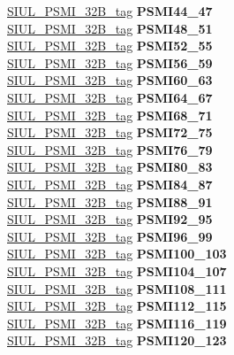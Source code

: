 \begin{DoxyCompactItemize}
\begin{tabbing}
\>\>\mbox{\hyperlink{unionSIUL__PSMI__32B__tag}{SIUL\_PSMI\_32B\_tag}} {\bfseries PSMI44\_47}\\
\>\>\mbox{\hyperlink{unionSIUL__PSMI__32B__tag}{SIUL\_PSMI\_32B\_tag}} {\bfseries PSMI48\_51}\\
\>\>\mbox{\hyperlink{unionSIUL__PSMI__32B__tag}{SIUL\_PSMI\_32B\_tag}} {\bfseries PSMI52\_55}\\
\>\>\mbox{\hyperlink{unionSIUL__PSMI__32B__tag}{SIUL\_PSMI\_32B\_tag}} {\bfseries PSMI56\_59}\\
\>\>\mbox{\hyperlink{unionSIUL__PSMI__32B__tag}{SIUL\_PSMI\_32B\_tag}} {\bfseries PSMI60\_63}\\
\>\>\mbox{\hyperlink{unionSIUL__PSMI__32B__tag}{SIUL\_PSMI\_32B\_tag}} {\bfseries PSMI64\_67}\\
\>\>\mbox{\hyperlink{unionSIUL__PSMI__32B__tag}{SIUL\_PSMI\_32B\_tag}} {\bfseries PSMI68\_71}\\
\>\>\mbox{\hyperlink{unionSIUL__PSMI__32B__tag}{SIUL\_PSMI\_32B\_tag}} {\bfseries PSMI72\_75}\\
\>\>\mbox{\hyperlink{unionSIUL__PSMI__32B__tag}{SIUL\_PSMI\_32B\_tag}} {\bfseries PSMI76\_79}\\
\>\>\mbox{\hyperlink{unionSIUL__PSMI__32B__tag}{SIUL\_PSMI\_32B\_tag}} {\bfseries PSMI80\_83}\\
\>\>\mbox{\hyperlink{unionSIUL__PSMI__32B__tag}{SIUL\_PSMI\_32B\_tag}} {\bfseries PSMI84\_87}\\
\>\>\mbox{\hyperlink{unionSIUL__PSMI__32B__tag}{SIUL\_PSMI\_32B\_tag}} {\bfseries PSMI88\_91}\\
\>\>\mbox{\hyperlink{unionSIUL__PSMI__32B__tag}{SIUL\_PSMI\_32B\_tag}} {\bfseries PSMI92\_95}\\
\>\>\mbox{\hyperlink{unionSIUL__PSMI__32B__tag}{SIUL\_PSMI\_32B\_tag}} {\bfseries PSMI96\_99}\\
\>\>\mbox{\hyperlink{unionSIUL__PSMI__32B__tag}{SIUL\_PSMI\_32B\_tag}} {\bfseries PSMI100\_103}\\
\>\>\mbox{\hyperlink{unionSIUL__PSMI__32B__tag}{SIUL\_PSMI\_32B\_tag}} {\bfseries PSMI104\_107}\\
\>\>\mbox{\hyperlink{unionSIUL__PSMI__32B__tag}{SIUL\_PSMI\_32B\_tag}} {\bfseries PSMI108\_111}\\
\>\>\mbox{\hyperlink{unionSIUL__PSMI__32B__tag}{SIUL\_PSMI\_32B\_tag}} {\bfseries PSMI112\_115}\\
\>\>\mbox{\hyperlink{unionSIUL__PSMI__32B__tag}{SIUL\_PSMI\_32B\_tag}} {\bfseries PSMI116\_119}\\
\>\>\mbox{\hyperlink{unionSIUL__PSMI__32B__tag}{SIUL\_PSMI\_32B\_tag}} {\bfseries PSMI120\_123}\\

\end{tabbing}
\end{DoxyCompactItemize}
